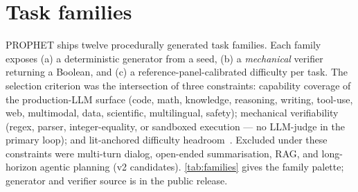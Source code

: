 \section{Task families}\label{sec:families}

PROPHET ships twelve procedurally generated task families. Each family
exposes (a) a deterministic generator from a seed, (b) a
\emph{mechanical} verifier returning a Boolean, and (c) a
reference-panel-calibrated difficulty per task. The selection criterion
was the intersection of three constraints: capability coverage of the
production-LLM surface (code, math, knowledge, reasoning, writing,
tool-use, web, multimodal, data, scientific, multilingual, safety);
mechanical verifiability (regex, parser, integer-equality, or sandboxed
execution --- no LLM-judge in the primary loop); and lit-anchored
difficulty headroom~\cite{enigmata,zebralogic,nppc,ojbench,lcbpro,
aethercode,nolima,olym_math}. Excluded under these constraints
were multi-turn dialog, open-ended summarisation, RAG, and long-horizon
agentic planning (v2 candidates). \autoref{tab:families} gives the
family palette; generator and verifier source is in the public release.

